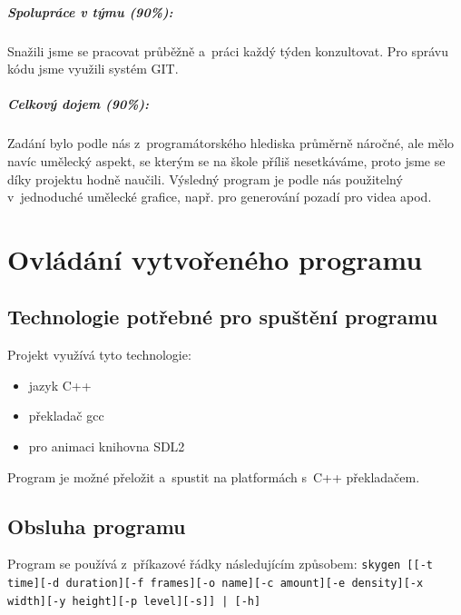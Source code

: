 \documentclass[12pt,a4paper,titlepage,final]{report}
\begin{document}
\paragraph{Spolupráce v týmu (90\%):}
Snažili jsme se pracovat průběžně a~práci každý týden konzultovat. Pro
správu kódu jsme využili systém GIT.

\paragraph{Celkový dojem (90\%):}
Zadání bylo podle nás z~programátorského hlediska průměrně náročné, ale
mělo navíc umělecký aspekt, se kterým se na škole příliš nesetkáváme,
proto jsme se díky projektu hodně naučili. Výsledný program je podle
nás použitelný v~jednoduché umělecké grafice, např. pro generování pozadí
pro videa apod.

\chapter{Ovládání vytvořeného programu}

\section{Technologie potřebné pro spuštění programu}
Projekt využívá tyto technologie:

\begin{itemize}
\item jazyk C++
\item překladač gcc
\item pro animaci knihovna SDL2
\end{itemize}

Program je možné přeložit a~spustit na platformách s~C++ překladačem.

\section{Obsluha programu}

Program se používá z~příkazové řádky následujícím způsobem:
{\tt skygen [[-t time][-d duration][-f frames][-o name][-c amount][-e density][-x width][-y height][-p level][-s]] | [-h]}
\end{document}
